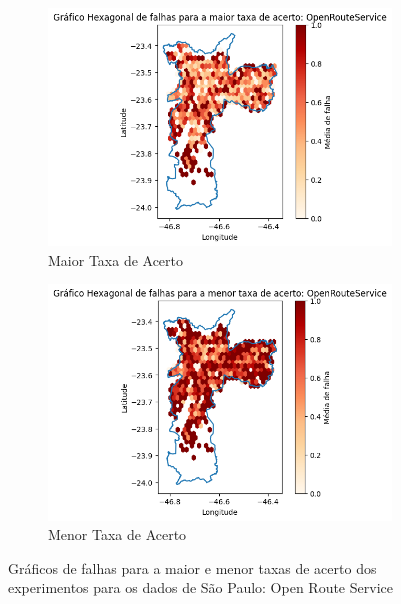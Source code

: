 \begin{figure}[ht]
    \centering
    \begin{subfigure}[b]{0.45\textwidth}
      \includegraphics[width=\textwidth]{Figuras/expFalhasORSmaiorSP.png}
      \caption{Maior Taxa de Acerto}
      \label{fig:falhasorsSPexpMaior}
    \end{subfigure}
    \hfill
    \begin{subfigure}[b]{0.45\textwidth}
      \includegraphics[width=\textwidth]{Figuras/expFalhasORSmenorSP.png}
      \caption{Menor Taxa de Acerto}
      \label{fig:falhasorsSPexpMenor}
    \end{subfigure}
    
    \caption{Gráficos de falhas para a maior e menor taxas de acerto dos experimentos para os dados de São Paulo: Open Route Service}
    \label{fig:falhas-exp-ors-sp}
\end{figure}
